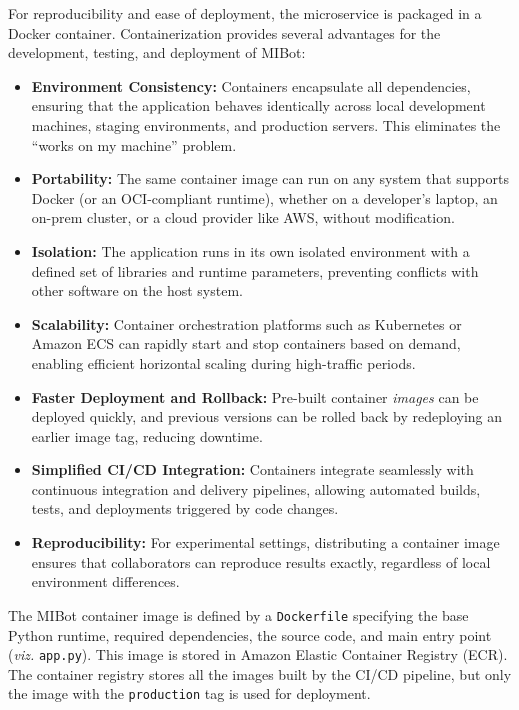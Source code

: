 For reproducibility and ease of deployment, the microservice is packaged in a Docker container. Containerization provides several advantages for the development, testing, and deployment of MIBot:

\begin{itemize}
\item \textbf{Environment Consistency:} Containers encapsulate all dependencies, ensuring that the application behaves identically across local development machines, staging environments, and production servers. This eliminates the ``works on my machine'' problem.

\item \textbf{Portability:} The same container image can run on any system that supports Docker (or an OCI-compliant runtime), whether on a developer's laptop, an on-prem cluster, or a cloud provider like AWS, without modification.

\item \textbf{Isolation:} The application runs in its own isolated environment with a defined set of libraries and runtime parameters, preventing conflicts with other software on the host system.

\item \textbf{Scalability:} Container orchestration platforms such as Kubernetes or Amazon ECS can rapidly start and stop containers based on demand, enabling efficient horizontal scaling during high-traffic periods.

\item \textbf{Faster Deployment and Rollback:} Pre-built container \emph{images} can be deployed quickly, and previous versions can be rolled back by redeploying an earlier image tag, reducing downtime.

\item \textbf{Simplified CI/CD Integration:} Containers integrate seamlessly with continuous integration and delivery pipelines, allowing automated builds, tests, and deployments triggered by code changes.

\item \textbf{Reproducibility:} For experimental settings, distributing a container image ensures that collaborators can reproduce results exactly, regardless of local environment differences.
\end{itemize}

The MIBot container image is defined by a \texttt{Dockerfile} specifying the base Python runtime, required dependencies, the source code, and main entry point (\emph{viz.} \texttt{app.py}). This image is stored in Amazon Elastic Container Registry (ECR). The container registry stores all the images built by the CI/CD pipeline, but only the image with the \texttt{production} tag is used for deployment.

